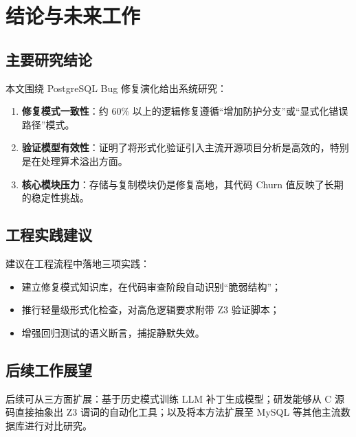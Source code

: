 \chapter{结论与未来工作}\label{chap:conclusion}

\section{主要研究结论}
本文围绕 PostgreSQL Bug 修复演化给出系统研究：
\begin{enumerate}
    \item \textbf{修复模式一致性}：约 60\% 以上的逻辑修复遵循“增加防护分支”或“显式化错误路径”模式。
    \item \textbf{验证模型有效性}：证明了将形式化验证引入主流开源项目分析是高效的，特别是在处理算术溢出方面。
    \item \textbf{核心模块压力}：存储与复制模块仍是修复高地，其代码 Churn 值反映了长期的稳定性挑战。
\end{enumerate}

\section{工程实践建议}
建议在工程流程中落地三项实践：
\begin{itemize}
    \item 建立修复模式知识库，在代码审查阶段自动识别“脆弱结构”；
    \item 推行轻量级形式化检查，对高危逻辑要求附带 Z3 验证脚本；
    \item 增强回归测试的语义断言，捕捉静默失效。
\end{itemize}

\section{后续工作展望}
后续可从三方面扩展：基于历史模式训练 LLM 补丁生成模型；研发能够从 C 源码直接抽象出 Z3 谓词的自动化工具；以及将本方法扩展至 MySQL 等其他主流数据库进行对比研究。